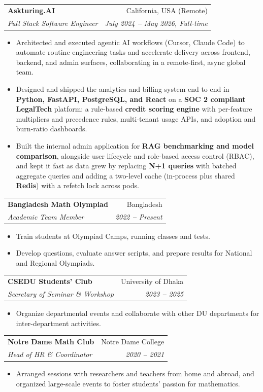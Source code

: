 \documentclass[a4paper,11pt]{article}
\makeatletter
\newcommand{\resumeItem}[1]{
  \item\small{\justifying #1 \vspace{-2pt}}
}
\newcommand{\resumeSubheading}[4]{
  \vspace{-2pt}\item
    \begin{tabular*}{0.97\textwidth}[t]{l@{\extracolsep{\fill}}r}
      \textbf{#1} & #2 \\
      \textit{\small#3} & \textit{\small #4} \\
    \end{tabular*}\vspace{-7pt}
}
\newcommand{\resumeItemListStart}{\begin{itemize}[leftmargin=0.2in]}
\newcommand{\resumeItemListEnd}{\end{itemize}\vspace{-5pt}}
\makeatother
\begin{document}
\resumeSubheading
  {Askturing.AI}{California, USA (Remote)}
  {Full Stack Software Engineer}{July 2024 \textbf{--} May 2026, Full-time}
  \resumeItemListStart
    \resumeItem{Architected and executed agentic AI workflows (Cursor, Claude Code) to automate routine engineering tasks and accelerate delivery across frontend, backend, and admin surfaces, collaborating in a remote-first, async global team.}
    \resumeItem{Designed and shipped the analytics and billing system end to end in \textbf{Python, FastAPI, PostgreSQL, and React} on a \textbf{SOC 2 compliant LegalTech} platform: a rule-based \textbf{credit scoring engine} with per-feature multipliers and precedence rules, multi-tenant usage APIs, and adoption and burn-ratio dashboards.}
    \resumeItem{Built the internal admin application for \textbf{RAG benchmarking and model comparison}, alongside user lifecycle and role-based access control (RBAC), and kept it fast as data grew by replacing \textbf{N+1 queries} with batched aggregate queries and adding a two-level cache (in-process plus shared \textbf{Redis}) with a refetch lock across pods.}
  \resumeItemListEnd


\resumeSubheading
  {Bangladesh Math Olympiad}{Bangladesh}
  {Academic Team Member}{2022 \textbf{--} Present}
  \resumeItemListStart
    \resumeItem{Train students at Olympiad Camps, running classes and tests.}
    \resumeItem{Develop questions, evaluate answer scripts, and prepare results for National and Regional Olympiads.}
  \resumeItemListEnd

\resumeSubheading
  {CSEDU Students' Club}{University of Dhaka}
  {Secretary of Seminar \& Workshop}{2023 \textbf{--} 2025}
  \resumeItemListStart
    \resumeItem{Organize departmental events and collaborate with other DU departments for inter-department activities.}
  \resumeItemListEnd

\resumeSubheading
  {Notre Dame Math Club}{Notre Dame College}
  {Head of HR \& Coordinator}{2020 \textbf{--} 2021}
  \resumeItemListStart
    \resumeItem{Arranged sessions with researchers and teachers from home and abroad, and organized large-scale events to foster students' passion for mathematics.}
  \resumeItemListEnd
\end{document}
